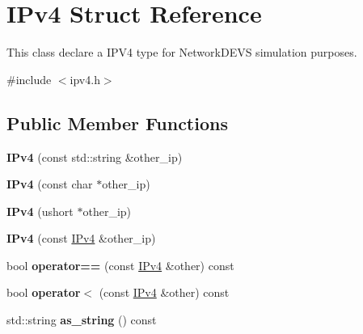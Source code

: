\hypertarget{structIPv4}{}\section{I\+Pv4 Struct Reference}
\label{structIPv4}


This class declare a I\+P\+V4 type for Network\+D\+E\+VS simulation purposes.  




{\ttfamily \#include $<$ipv4.\+h$>$}

\subsection*{Public Member Functions}
\begin{DoxyCompactItemize}
\item 
{\bfseries I\+Pv4} (const std\+::string \&other\+\_\+ip)\hypertarget{structIPv4_a08282c7d0d3411aee1135ba0195d27c6}{}\label{structIPv4_a08282c7d0d3411aee1135ba0195d27c6}

\item 
{\bfseries I\+Pv4} (const char $\ast$other\+\_\+ip)\hypertarget{structIPv4_a719104625fa0bd5890348ee1be6b370f}{}\label{structIPv4_a719104625fa0bd5890348ee1be6b370f}

\item 
{\bfseries I\+Pv4} (ushort $\ast$other\+\_\+ip)\hypertarget{structIPv4_ac8dddaa9a429dcffdd72c6adc5ebf742}{}\label{structIPv4_ac8dddaa9a429dcffdd72c6adc5ebf742}

\item 
{\bfseries I\+Pv4} (const \hyperlink{structIPv4}{I\+Pv4} \&other\+\_\+ip)\hypertarget{structIPv4_ad8d3deea36179f336b91123feea5dadd}{}\label{structIPv4_ad8d3deea36179f336b91123feea5dadd}

\item 
bool {\bfseries operator==} (const \hyperlink{structIPv4}{I\+Pv4} \&other) const \hypertarget{structIPv4_ae48386c1a1459ba91d3303139f93a345}{}\label{structIPv4_ae48386c1a1459ba91d3303139f93a345}

\item 
bool {\bfseries operator$<$} (const \hyperlink{structIPv4}{I\+Pv4} \&other) const \hypertarget{structIPv4_aca07a74ffaa34d0593425ea5523a31e7}{}\label{structIPv4_aca07a74ffaa34d0593425ea5523a31e7}

\item 
std\+::string {\bfseries as\+\_\+string} () const \hypertarget{structIPv4_acb7ed5ccf7af572bbc32396dcd1fe3cb}{}\label{structIPv4_acb7ed5ccf7af572bbc32396dcd1fe3cb}


\end{DoxyCompactItemize}

